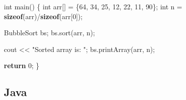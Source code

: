 \documentclass[
  letterpaper,
  DIV=11,
  numbers=noendperiod]{scrreprt}
\newenvironment{Shaded}{\begin{snugshade}}{\end{snugshade}}
\newcommand{\ControlFlowTok}[1]{\textcolor[rgb]{0.00,0.23,0.31}{\textbf{#1}}}
\newcommand{\DataTypeTok}[1]{\textcolor[rgb]{0.68,0.00,0.00}{#1}}
\newcommand{\DecValTok}[1]{\textcolor[rgb]{0.68,0.00,0.00}{#1}}
\newcommand{\KeywordTok}[1]{\textcolor[rgb]{0.00,0.23,0.31}{\textbf{#1}}}
\newcommand{\NormalTok}[1]{\textcolor[rgb]{0.00,0.23,0.31}{#1}}
\newcommand{\OperatorTok}[1]{\textcolor[rgb]{0.37,0.37,0.37}{#1}}
\newcommand{\StringTok}[1]{\textcolor[rgb]{0.13,0.47,0.30}{#1}}
\begin{document}
\begin{Shaded}
\begin{Highlighting}[]
\DataTypeTok{int}\NormalTok{ main}\OperatorTok{()} \OperatorTok{\{}
    \DataTypeTok{int}\NormalTok{ arr}\OperatorTok{[]} \OperatorTok{=} \OperatorTok{\{}\DecValTok{64}\OperatorTok{,} \DecValTok{34}\OperatorTok{,} \DecValTok{25}\OperatorTok{,} \DecValTok{12}\OperatorTok{,} \DecValTok{22}\OperatorTok{,} \DecValTok{11}\OperatorTok{,} \DecValTok{90}\OperatorTok{\};}
    \DataTypeTok{int}\NormalTok{ n }\OperatorTok{=} \KeywordTok{sizeof}\OperatorTok{(}\NormalTok{arr}\OperatorTok{)/}\KeywordTok{sizeof}\OperatorTok{(}\NormalTok{arr}\OperatorTok{[}\DecValTok{0}\OperatorTok{]);}

\NormalTok{    BubbleSort bs}\OperatorTok{;}
\NormalTok{    bs}\OperatorTok{.}\NormalTok{sort}\OperatorTok{(}\NormalTok{arr}\OperatorTok{,}\NormalTok{ n}\OperatorTok{);}

\NormalTok{    cout }\OperatorTok{\textless{}\textless{}} \StringTok{"Sorted array is: "}\OperatorTok{;}
\NormalTok{    bs}\OperatorTok{.}\NormalTok{printArray}\OperatorTok{(}\NormalTok{arr}\OperatorTok{,}\NormalTok{ n}\OperatorTok{);}

    \ControlFlowTok{return} \DecValTok{0}\OperatorTok{;}
\OperatorTok{\}}
\end{Highlighting}
\end{Shaded}

\subsection{Java}\label{java}
\end{document}

